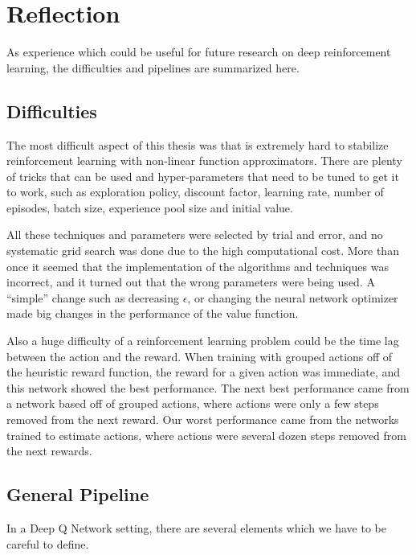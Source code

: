 \section{Reflection}

As experience which could be useful for future research on deep reinforcement learning, the difficulties and pipelines are summarized here.

\subsection{Difficulties}

The most difficult aspect of this thesis was that is extremely hard to stabilize reinforcement learning with non-linear function approximators. There are plenty of tricks that can be used and hyper-parameters that need to be tuned to get it to work, such as exploration policy, discount factor, learning rate, number of episodes, batch size, experience pool size and initial value.

All these techniques and parameters were selected by trial and error, and no systematic grid search was done due to the high computational cost. More than once it seemed that the implementation of the algorithms and techniques was incorrect, and it turned out that the wrong parameters were being used. A ``simple'' change such as decreasing $\epsilon$, or changing the neural network optimizer made big changes in the performance of the value function.

Also a huge difficulty of a reinforcement learning problem could be the time lag between the action and the reward. When training with grouped actions off of the heuristic reward function, the reward for a given action was immediate, and this network showed the best performance. The next best performance came from a network based off of grouped actions, where actions were only a few steps removed from the next reward. Our worst performance came from the networks trained to estimate actions, where actions were several dozen steps removed from the next rewards.

\subsection{General Pipeline}

In a Deep Q Network setting, there are several elements which we have to be careful to define.

